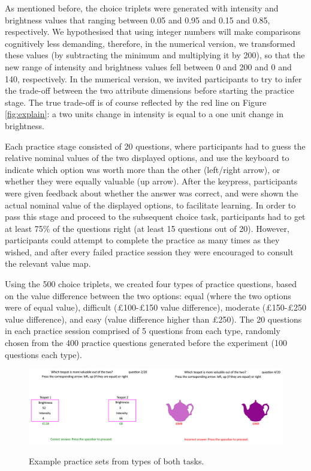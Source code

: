 \documentclass[11pt,a4paper]{article}
\begin{document}
As mentioned before, the choice triplets were generated with intensity and brightness values that ranging between 0.05 and 0.95 and 0.15 and 0.85, respectively.  We hypothesised that using integer numbers will make comparisons cognitively less demanding, therefore, in the numerical version, we transformed these values (by subtracting the minimum and multiplying it by 200), so that the new range of intensity and brightness values fell between 0 and 200 and 0 and 140, respectively. In the numerical version, we invited participants to try to infer the trade-off between the two attribute dimensions before starting the practice stage. The true trade-off is of course reflected by the red line on Figure \ref{fig:explain}: a two units change in intensity is equal to a one unit change in brightness.

Each practice stage consisted of 20 questions, where participants had to guess the relative nominal values of the two displayed options, and use the keyboard to indicate which option was worth more than the other (left/right arrow), or whether they were equally valuable (up arrow). After the keypress, participants were given feedback about whether the answer was correct, and were shown the actual nominal value of the displayed options, to facilitate learning.
In order to pass this stage and proceed to the subsequent choice task, participants had to get at least 75\% of the questions right (at least 15 questions out of 20). However, participants could attempt to complete the practice as many times as they wished, and after every failed practice session they were encouraged to consult the relevant value map. 

Using the 500 choice triplets, we created four types of practice questions, based on the value difference between the two options: equal (where the two options were of equal value), difficult (£100-£150 value difference), moderate (£150-£250 value difference), and easy (value difference higher than £250). The 20 questions in each practice session comprised of 5 questions from each type, randomly chosen from the 400 practice questions generated before the experiment (100 questions each type).


\begin{figure}
\centering
\caption{Example practice sets from types of both tasks.}
\includegraphics[width=1\textwidth]{practice.png}
\label{fig:practice}
\end{figure}
\end{document}
